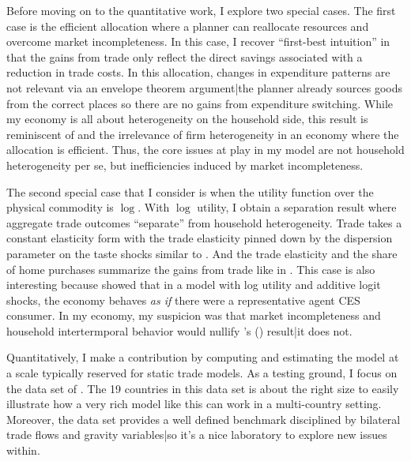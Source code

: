\documentclass[12pt,pdftex]{article}
\def\citeapos#1{\citeauthor{#1}'s (\citeyear{#1})}
\begin{document}
\begin{onehalfspacing}
Before moving on to the quantitative work, I explore two special cases. The first case is the efficient allocation where a planner can reallocate resources and overcome market incompleteness. In this case, I recover ``first-best intuition'' in that the gains from trade only reflect the direct savings associated with a reduction in trade costs. In this allocation, changes in expenditure patterns are not relevant via an envelope theorem argument|the planner already sources goods from the correct places so there are no gains from expenditure switching. While my economy is all about heterogeneity on the household side, this result is reminiscent of \citet{AtkesonBurstein2010} and the irrelevance of firm heterogeneity in an economy where the allocation is efficient. Thus, the core issues at play in my model are not household heterogeneity per se, but inefficiencies induced by market incompleteness.

The second special case that I consider is when the utility function over the physical commodity is $\log$. With $\log$ utility, I obtain a separation result where aggregate trade outcomes ``separate'' from household heterogeneity. Trade takes a constant elasticity form with the trade elasticity pinned down by the dispersion parameter on the taste shocks similar to \citet{eaton2002technology}. And the trade elasticity and the share of home purchases summarize the gains from trade like in \citet{arkolakis2012new}. This case is also interesting because \citet*{anderson1987ces} showed that in a model with log utility and additive logit shocks, the economy behaves \emph{as if} there were a representative agent CES consumer. In my economy, my suspicion was that market incompleteness and household intertermporal behavior would nullify \citeapos{anderson1987ces} result|it does not.

Quantitatively, I make a contribution by computing and estimating the model at a scale typically reserved for static trade models. As a testing ground, I focus on the data set of \citet{eaton2002technology}. The 19 countries in this data set is about the right size to easily illustrate how a very rich model like this can work in a multi-country setting. Moreover, the \citet{eaton2002technology} data set provides a well defined benchmark disciplined by bilateral trade flows and gravity variables|so it's a nice laboratory to explore new issues within.


\end{onehalfspacing}
\end{document}
